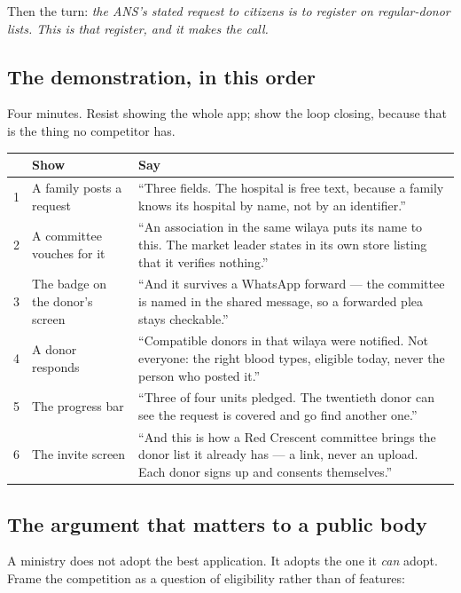 \documentclass[11pt,a4paper]{article}
\begin{document}
Then the turn: \emph{the ANS's stated request to citizens is to register on
regular-donor lists. This is that register, and it makes the call.}

\subsection{The demonstration, in this order}

Four minutes. Resist showing the whole app; show the loop closing, because that
is the thing no competitor has.

\begin{center}
\begin{tabularx}{\textwidth}{@{}rlX@{}}
\toprule
& \textbf{Show} & \textbf{Say} \\
\midrule
1 & A family posts a request & ``Three fields. The hospital is free text,
because a family knows its hospital by name, not by an identifier.'' \\
2 & A committee vouches for it & ``An association in the same wilaya puts its
name to this. The market leader states in its own store listing that it
verifies nothing.'' \\
3 & The badge on the donor's screen & ``And it survives a WhatsApp forward —
the committee is named in the shared message, so a forwarded plea stays
checkable.'' \\
4 & A donor responds & ``Compatible donors in that wilaya were notified. Not
everyone: the right blood types, eligible today, never the person who posted
it.'' \\
5 & The progress bar & ``Three of four units pledged. The twentieth donor can
see the request is covered and go find another one.'' \\
6 & The invite screen & ``And this is how a Red Crescent committee brings the
donor list it already has — a link, never an upload. Each donor signs up and
consents themselves.'' \\
\bottomrule
\end{tabularx}
\end{center}

\subsection{The argument that matters to a public body}

A ministry does not adopt the best application. It adopts the one it
\emph{can} adopt. Frame the competition as a question of eligibility rather
than of features:
\end{document}
